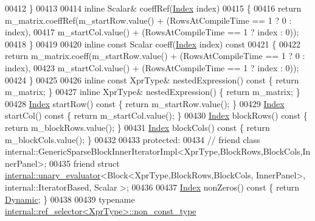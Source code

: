 \begin{DoxyCode}
00412     \}
00413 
00414     \textcolor{keyword}{inline} Scalar& coeffRef(\hyperlink{group___core___module_a554f30542cc2316add4b1ea0a492ff02}{Index} index)
00415     \{
00416       \textcolor{keywordflow}{return} m\_matrix.coeffRef(m\_startRow.value() + (RowsAtCompileTime == 1 ? 0 : index),
00417                                m\_startCol.value() + (RowsAtCompileTime == 1 ? index : 0));
00418     \}
00419 
00420     \textcolor{keyword}{inline} \textcolor{keyword}{const} Scalar coeff(\hyperlink{group___core___module_a554f30542cc2316add4b1ea0a492ff02}{Index} index)\textcolor{keyword}{ const}
00421 \textcolor{keyword}{    }\{
00422       \textcolor{keywordflow}{return} m\_matrix.coeff(m\_startRow.value() + (RowsAtCompileTime == 1 ? 0 : index),
00423                             m\_startCol.value() + (RowsAtCompileTime == 1 ? index : 0));
00424     \}
00425 
00426     \textcolor{keyword}{inline} \textcolor{keyword}{const} XprType& nestedExpression()\textcolor{keyword}{ const }\{ \textcolor{keywordflow}{return} m\_matrix; \}
00427     \textcolor{keyword}{inline} XprType& nestedExpression() \{ \textcolor{keywordflow}{return} m\_matrix; \}
00428     \hyperlink{group___core___module_a554f30542cc2316add4b1ea0a492ff02}{Index} startRow()\textcolor{keyword}{ const }\{ \textcolor{keywordflow}{return} m\_startRow.value(); \}
00429     \hyperlink{group___core___module_a554f30542cc2316add4b1ea0a492ff02}{Index} startCol()\textcolor{keyword}{ const }\{ \textcolor{keywordflow}{return} m\_startCol.value(); \}
00430     \hyperlink{group___core___module_a554f30542cc2316add4b1ea0a492ff02}{Index} blockRows()\textcolor{keyword}{ const }\{ \textcolor{keywordflow}{return} m\_blockRows.value(); \}
00431     \hyperlink{group___core___module_a554f30542cc2316add4b1ea0a492ff02}{Index} blockCols()\textcolor{keyword}{ const }\{ \textcolor{keywordflow}{return} m\_blockCols.value(); \}
00432 
00433   \textcolor{keyword}{protected}:
00434 \textcolor{comment}{//     friend class internal::GenericSparseBlockInnerIteratorImpl<XprType,BlockRows,BlockCols,InnerPanel>;}
00435     \textcolor{keyword}{friend} \textcolor{keyword}{struct }\hyperlink{struct_eigen_1_1internal_1_1unary__evaluator}{internal::unary\_evaluator}<Block<XprType,BlockRows,BlockCols,
      InnerPanel>, internal::IteratorBased, Scalar >;
00436 
00437     \hyperlink{group___core___module_a554f30542cc2316add4b1ea0a492ff02}{Index} nonZeros() const \{ \textcolor{keywordflow}{return} \hyperlink{namespace_eigen_ad81fa7195215a0ce30017dfac309f0b2}{Dynamic}; \}
00438 
00439     \textcolor{keyword}{typename} \hyperlink{class_eigen_1_1internal_1_1_tensor_lazy_evaluator_writable}{internal::ref\_selector<XprType>::non\_const\_type}

\end{DoxyCode}
